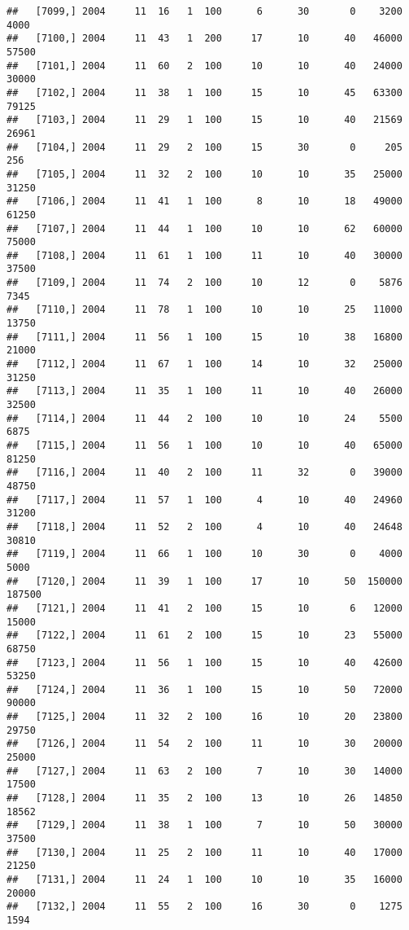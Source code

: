\documentclass{article}\usepackage[]{graphicx}\usepackage[]{color}
\makeatletter
\newenvironment{kframe}{%
 \def\at@end@of@kframe{}%
 \ifinner\ifhmode%
  \def\at@end@of@kframe{\end{minipage}}%
  \begin{minipage}{\columnwidth}%
 \fi\fi%
 \def\FrameCommand##1{\hskip\@totalleftmargin \hskip-\fboxsep
 \colorbox{shadecolor}{##1}\hskip-\fboxsep
     \hskip-\linewidth \hskip-\@totalleftmargin \hskip\columnwidth}%
 \MakeFramed {\advance\hsize-\width
   \@totalleftmargin\z@ \linewidth\hsize
   \@setminipage}}%
 {\par\unskip\endMakeFramed%
 \at@end@of@kframe}
\newenvironment{knitrout}{}{} %
\makeatother
\begin{document}
\begin{knitrout}
\begin{kframe}
\begin{verbatim}
##   [7099,] 2004     11  16   1  100      6      30       0    3200    4000
##   [7100,] 2004     11  43   1  200     17      10      40   46000   57500
##   [7101,] 2004     11  60   2  100     10      10      40   24000   30000
##   [7102,] 2004     11  38   1  100     15      10      45   63300   79125
##   [7103,] 2004     11  29   1  100     15      10      40   21569   26961
##   [7104,] 2004     11  29   2  100     15      30       0     205     256
##   [7105,] 2004     11  32   2  100     10      10      35   25000   31250
##   [7106,] 2004     11  41   1  100      8      10      18   49000   61250
##   [7107,] 2004     11  44   1  100     10      10      62   60000   75000
##   [7108,] 2004     11  61   1  100     11      10      40   30000   37500
##   [7109,] 2004     11  74   2  100     10      12       0    5876    7345
##   [7110,] 2004     11  78   1  100     10      10      25   11000   13750
##   [7111,] 2004     11  56   1  100     15      10      38   16800   21000
##   [7112,] 2004     11  67   1  100     14      10      32   25000   31250
##   [7113,] 2004     11  35   1  100     11      10      40   26000   32500
##   [7114,] 2004     11  44   2  100     10      10      24    5500    6875
##   [7115,] 2004     11  56   1  100     10      10      40   65000   81250
##   [7116,] 2004     11  40   2  100     11      32       0   39000   48750
##   [7117,] 2004     11  57   1  100      4      10      40   24960   31200
##   [7118,] 2004     11  52   2  100      4      10      40   24648   30810
##   [7119,] 2004     11  66   1  100     10      30       0    4000    5000
##   [7120,] 2004     11  39   1  100     17      10      50  150000  187500
##   [7121,] 2004     11  41   2  100     15      10       6   12000   15000
##   [7122,] 2004     11  61   2  100     15      10      23   55000   68750
##   [7123,] 2004     11  56   1  100     15      10      40   42600   53250
##   [7124,] 2004     11  36   1  100     15      10      50   72000   90000
##   [7125,] 2004     11  32   2  100     16      10      20   23800   29750
##   [7126,] 2004     11  54   2  100     11      10      30   20000   25000
##   [7127,] 2004     11  63   2  100      7      10      30   14000   17500
##   [7128,] 2004     11  35   2  100     13      10      26   14850   18562
##   [7129,] 2004     11  38   1  100      7      10      50   30000   37500
##   [7130,] 2004     11  25   2  100     11      10      40   17000   21250
##   [7131,] 2004     11  24   1  100     10      10      35   16000   20000
##   [7132,] 2004     11  55   2  100     16      30       0    1275    1594

\end{verbatim}
\end{kframe}
\end{knitrout}
\end{document}
